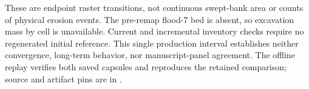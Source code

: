 These are endpoint raster transitions, not continuous swept-bank area
or counts of physical erosion events. The pre-remap flood-7 bed is absent,
so excavation mass by cell is unavailable. Current and incremental
inventory checks require no regenerated initial reference. This single
production interval establishes neither convergence, long-term behavior,
nor manuscript-panel agreement. The offline replay verifies both saved
capsules and reproduces the retained comparison; source and artifact pins
are in .
